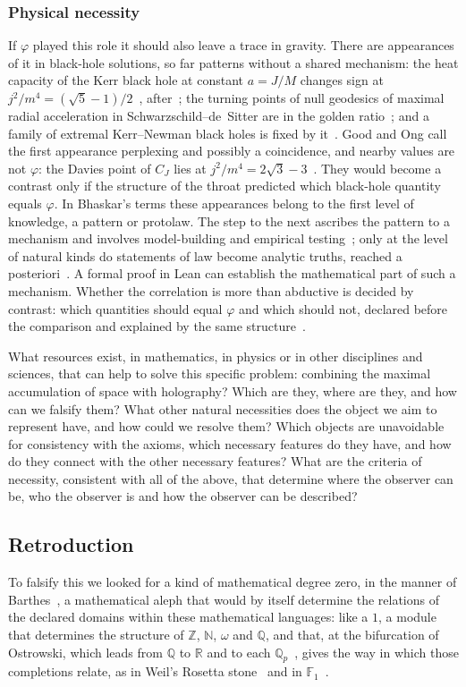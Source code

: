 \documentclass[11pt,reqno]{amsart}
\newcommand{\golden}{\varphi}
\numberwithin{equation}{section}
\theoremstyle{remark}
\begin{document}
\subsubsection{Physical necessity}
If $\golden$ played this role it should also leave a trace in gravity. There are appearances of it in
black-hole solutions, so far patterns without a shared mechanism: the heat capacity of the Kerr black
hole at constant $a=J/M$ changes sign at $j^2/m^4=(\sqrt5-1)/2$~\cite{GO15}, after~\cite{Dav77}; the
turning points of null geodesics of maximal radial acceleration in Schwarzschild--de~Sitter are in the
golden ratio~\cite{COV17}; and a family of extremal Kerr--Newman black holes is fixed by
it~\cite{SN24}. Good and Ong call the first appearance perplexing and possibly a coincidence, and nearby
values are not $\golden$: the Davies point of $C_J$ lies at $j^2/m^4=2\sqrt3-3$~\cite{Dav77}. They would
become a contrast only if the structure of the throat predicted which black-hole quantity equals
$\golden$. In Bhaskar's terms these appearances belong to the first level of knowledge, a pattern or
protolaw. The step to the next ascribes the pattern to a mechanism and involves model-building and
empirical testing~\cite[p.~163]{Bha75}; only at the level of natural kinds do statements of law become
analytic truths, reached a posteriori~\cite[p.~165]{Bha75}. A formal proof in Lean can establish the
mathematical part of such a mechanism. Whether the correlation is more than abductive is decided by
contrast: which quantities should equal $\golden$ and which should not, declared before the comparison
and explained by the same structure~\cite[pp.~151--153]{Law97}.

What resources exist, in mathematics, in physics or in other disciplines and sciences, that can help
to solve this specific problem: combining the maximal accumulation of space with holography? Which
are they, where are they, and how can we falsify them? What other natural necessities does the
object we aim to represent have, and how could we resolve them? Which objects are unavoidable for
consistency with the axioms, which necessary features do they have, and how do they connect with the
other necessary features? What are the criteria of necessity, consistent with all of the above, that
determine where the observer can be, who the observer is and how the observer can be described?

\subsection{Retroduction}
To falsify this we looked for a kind of mathematical degree zero, in the manner of
Barthes~\cite{Bar53}, a mathematical aleph that would by itself determine the relations of the
declared domains within these mathematical languages: like a $1$, a module that determines the
structure of $\mathbb Z$, $\mathbb N$, $\omega$ and $\mathbb Q$, and that, at the bifurcation of
Ostrowski, which leads from $\mathbb Q$ to $\mathbb R$ and to each $\mathbb Q_p$~\cite{Ost16}, gives the
way in which those completions relate, as in Weil's Rosetta stone~\cite{Wei40} and in
$\mathbb F_1$~\cite{Tit57,CC10,F1}.
\end{document}
